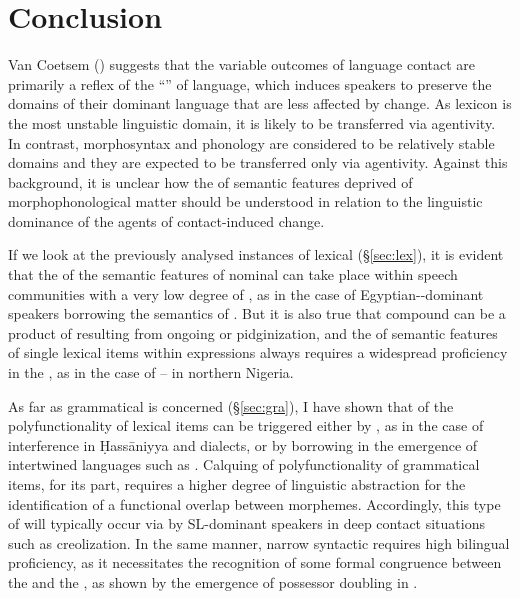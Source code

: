 \documentclass[output=paper]{langsci/langscibook}
\begin{document}
\section{Conclusion}\largerpage

Van Coetsem (\citeyear[20]{VanCoetsem1988}) suggests that the variable outcomes of language contact are primarily a reflex of the ``'' of language, which induces speakers to preserve the domains of their dominant language that are less affected by change. As lexicon is the most unstable linguistic domain, it is likely to be transferred via  agentivity. In contrast, morphosyntax and phonology are considered to be relatively stable domains and they are expected to be transferred only via  agentivity. Against this background, it is unclear how the  of semantic features deprived of morphophonological matter should be understood in relation to the linguistic dominance of the agents of contact-induced change. 

If we look at the previously analysed instances of lexical  (§\ref{sec:lex}), it is evident that the  of the semantic features of nominal  can take place within speech communities with a very low degree of , as in the case of {Egyptian}--dominant speakers borrowing the semantics of  . But it is also true that compound  can be a product of  resulting from ongoing  or pidginization, and the  of semantic features of single lexical items within  expressions always requires a widespread proficiency in the , as in the case of –  in northern Nigeria.\largerpage

As far as grammatical  is concerned (§\ref{sec:gra}), I have shown that  of the polyfunctionality of lexical items can be triggered either by , as in the case of  interference in Ḥass\-āniyya and  dialects, or by borrowing in the emergence of intertwined languages such as . Calquing of polyfunctionality of grammatical items, for its part, requires a higher degree of linguistic abstraction for the identification of a functional overlap between morphemes. Accordingly, this type of  will typically occur via  by SL-dominant speakers in deep contact situations such as creolization. In the same manner, narrow syntactic  requires high bilingual proficiency, as it necessitates the recognition of some formal congruence between the  and the , as shown by the emergence of possessor doubling in  .  
\end{document}
